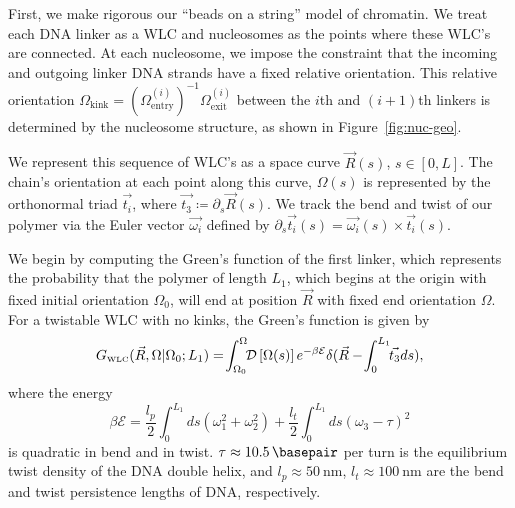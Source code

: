 \documentclass[%
 reprint,
superscriptaddress,
showpacs,preprintnumbers,
 amsmath,amssymb,
 aps,
 prl,
]{revtex4-1}
\newcommand{\gwlc}[2][\Omega_0; L_0]{G_\text{\tiny WLC}(#2|#1)}
\newcommand{\greens}[2][\Omega_0; L]{G(#2|#1)}
\newcommand{\pathd}[1]{\mathcal{D}\left[#1\right]}
\newcommand{\energy}{\mathcal{E}}
\begin{document}
%
First, we make rigorous our ``beads on a string'' model of chromatin.
We treat each DNA linker as a WLC and nucleosomes as the points where these
    WLC's are connected.
At each nucleosome, we impose the constraint that the incoming and outgoing
    linker DNA strands have a fixed relative orientation. This relative
    orientation $\Omega_\text{kink}  = {(\Omega^{(i)}_\text{entry})}^{-1}
    \Omega^{(i)}_\text{exit}$ between the $i$th and $(i+1)$th linkers is
    determined by the nucleosome structure, as shown in
    Figure~\ref{fig:nuc-geo}.

We represent this sequence of WLC's as a space curve $\vec{R}(s)$, $s\in[0,L]$.
    The chain's orientation at each point along this curve, $\Omega(s)$ is
    represented by the orthonormal triad
    $\vec{t_i}$, where $\vec{t_3} \coloneqq \partial_s \vec{R}(s)$.
We track the bend and twist of our polymer via the Euler vector $\vec{\omega_i}$
    defined by ${\partial_s \vec{t_i}(s) = \vec{\omega_i}(s) \times
    \vec{t_i}(s)}$.

We begin by computing the Green's function of the first linker, which represents
the probability that the polymer of length $L_1$, which begins at
the origin with fixed initial orientation $\Omega_0$, will end at position
$\vec{R}$ with fixed end orientation $\Omega$.
For a twistable WLC with no kinks, the Green's function is given by
\begin{equation}\label{eq:path}
    \gwlc[\Omega_0;L_1]{\vec{R}, \Omega} =\! \int_{\Omega_0}^{\Omega} \!\! \pathd{\Omega(s)}
              e^{-\beta \mathcal{E}}\delta(\vec{R} - \!\int_{0}^{L_1} \!\!\vec{t_3} ds),
\end{equation}
    where the energy
\begin{equation}\label{eq:energy}
    \beta\energy = \frac{l_p}{2}\int_{0}^{L_1} ds
    (\omega_1^2 + \omega_2 ^2) + \frac{l_t}{2}\int_{0}^{L_1} ds
    {\left(\omega_3 - \tau\right)}^2
\end{equation}
    is quadratic in bend and in twist. {$\tau \approx \SI{10.5}{\basepair}$}
    per turn is the equilibrium twist density of the DNA double helix, and {$l_p
    \approx \SI{50}{\nano\metre}$}, {$l_t \approx \SI{100}{\nano\metre}$} are
    the bend and twist persistence lengths of DNA, respectively.
\end{document}
